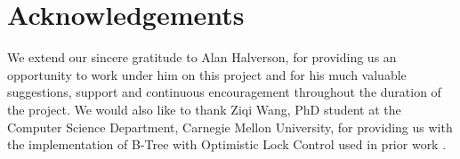 \documentclass[twocolumn]{article}
\begin{document}
\section*{Acknowledgements}

We extend our sincere gratitude to Alan Halverson, for providing us an
opportunity to work under him on this project and for his much valuable
suggestions, support and continuous encouragement throughout the duration of
the project. We would also like to thank Ziqi Wang, PhD student at the Computer
Science Department, Carnegie Mellon University, for providing us with the
implementation of B-Tree with Optimistic Lock Control used in prior work \cite{olc, critique}.



\end{document}
